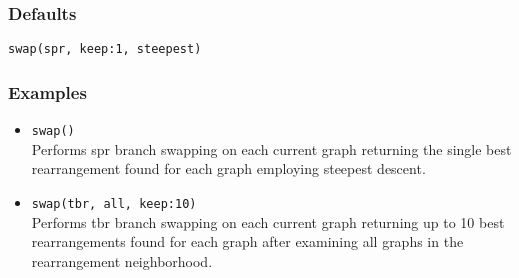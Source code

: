 \documentclass[11pt]{article}
\begin{document}
		\subsubsection{Defaults}
		\texttt{swap(spr, keep:1, steepest)}
		
		\subsubsection{Examples}
			\begin{itemize}
			\item{\texttt{swap()}\\Performs spr branch swapping on each current graph returning the single best rearrangement found for each graph  employing steepest descent.}
			\item{\texttt{swap(tbr, all, keep:10)}\\Performs tbr branch swapping on each current graph returning up to 10 best rearrangements found for each graph after examining all 
			graphs in the rearrangement neighborhood.}
			
		\end{itemize}
		
%	
%	
\end{document}
